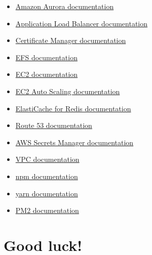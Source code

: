 \documentclass{article}
\begin{document}
\begin{itemize}
    \item \href{https://docs.aws.amazon.com/AmazonRDS/latest/AuroraUserGuide/CHAP_AuroraOverview.html}{Amazon Aurora documentation}
    \item \href{https://docs.aws.amazon.com/elasticloadbalancing/latest/application/introduction.html}{Application Load Balancer documentation}
    \item \href{https://docs.aws.amazon.com/acm/latest/userguide/acm-overview.html}{Certificate Manager documentation}
    \item \href{https://docs.aws.amazon.com/efs/latest/ug/whatisefs.html}{EFS documentation}
    \item \href{https://docs.aws.amazon.com/AWSEC2/latest/UserGuide/concepts.html}{EC2 documentation}
    \item \href{https://docs.aws.amazon.com/autoscaling/ec2/userguide/what-is-amazon-ec2-auto-scaling.html}{EC2 Auto Scaling documentation}
    \item \href{https://docs.aws.amazon.com/AmazonElastiCache/latest/red-ug/WhatIs.html}{ElastiCache for Redis documentation}
    \item \href{https://docs.aws.amazon.com/Route53/latest/DeveloperGuide/Welcome.html}{Route 53 documentation}
    \item \href{https://docs.aws.amazon.com/secretsmanager/latest/userguide/intro.html}{AWS Secrets Manager documentation}
    \item \href{https://docs.aws.amazon.com/vpc/latest/userguide/what-is-amazon-vpc.html}{VPC documentation}
    \item \href{https://docs.npmjs.com/cli/v8/commands/}{npm documentation}
    \item \href{https://classic.yarnpkg.com/en/docs}{yarn documentation}
    \item \href{https://pm2.keymetrics.io/docs/usage/process-management/}{PM2 documentation}
\end{itemize}

\section*{Good luck!}
\end{document}
